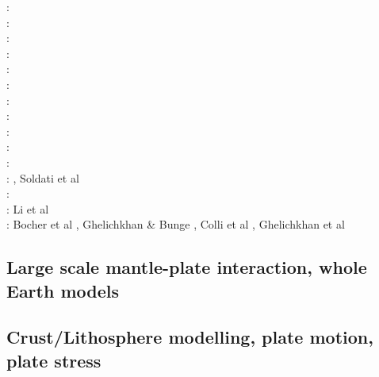 \begin{scriptsize}
\nineteenninetyeight: \cite{cava98}\\
\nineteenninetynine: \cite{samb99}\cite{samb99b}\\
\twothousandone: \cite{bomo01}\cite{kapo01}\\
\twothousandtwo: \cite{shri02}\cite{burb02}\\
\twothousandthree: \cite{buht03}\\
\twothousandfour: \cite{isst04}\\
\twothousandseven: \cite{isks07}\\
\twothousandeight: \cite{splg08}\cite{ligu08}\\
\twothousandnine: \cite{wama09}\cite{splg09}\cite{sifg09}\\
\twothousandtwelve: \cite{naco12}\\
\twothousandfourteen: \cite{wosp14}\cite{hobo14}\cite{licl14}\\
\twothousandfifteen: \cite{wahg15}\cite{cobs15}\cite{vybu15}, Soldati et al \cite{sobd15}\\
\twothousandsixteen: \cite{ghbu16}\cite{bocf16}\cite{yagu16}\cite{baum16}\cite{pric16}\\
\twothousandseventeen: Li et al \cite{ligs17}\\
\twothousandeighteen: Bocher et al \cite{bofc18}, Ghelichkhan \& Bunge \cite{ghbu18}, Colli et al \cite{cogb18}, Ghelichkhan et al \cite{ghmc18}
\end{scriptsize}

\subsection{Large scale mantle-plate interaction, whole Earth models}

\cite{yufl85}
\cite{loja95}
\cite{coli06}
\cite{wamg10}\cite{golw00}\cite{stgb10}\cite{cobe10}
\cite{algs12}\cite{roct12}\cite{crtm12}
\cite{ghbh13}\cite{yahb13}
\cite{macs16}
\cite{hulz18}\cite{osss18b}

\subsection{Crust/Lithosphere modelling, plate motion, plate stress}

